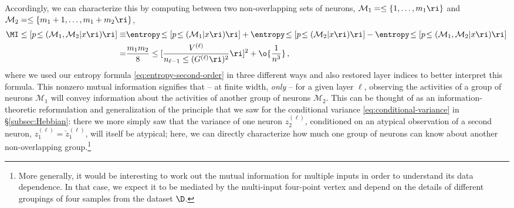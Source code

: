 Accordingly, we can characterize this  by computing  between two non-overlapping sets of neurons, $\mathcal{M}_1=\le\{1,\ldots,m_1\ri\}$ and $\mathcal{M}_2=\le\{m_1+1,\ldots,m_1+m_2\ri\}$, %
\begin{align}\label{eq:MIT-second-order}
\MI\le[p\!\le( \mathcal{M}_1 , \mathcal{M}_2 \vert x\ri)\ri]\equiv&\entropy\!\le[p\!\le(\mathcal{M}_1 \vert x\ri)\ri]+\entropy\!\le[p\!\le(\mathcal{M}_2 \vert x\ri)\ri]-\entropy\!\le[p\!\le(\mathcal{M}_1 , \mathcal{M}_2 \vert x\ri)\ri]\, \\
=&\frac{m_1m_2}{8}\le[\frac{V^{(\ell)}}{n_{\ell-1} \le(G^{(\ell)}\ri)^2 }\ri]^2+\o{\frac{1}{n^3}}\, ,\notag
\end{align}
where we used our entropy formula \eqref{eq:entropy-second-order} in three different ways and also restored layer indices 
to better interpret this formula.
This nonzero mutual information signifies that -- at finite width, \emph{only} --  for a given layer $\ell$, observing the activities of a group of neurons $\mathcal{M}_1$ will convey information about the activities of another group of neurons $\mathcal{M}_2$. This can be thought of as an information-theoretic reformulation and generalization of the  principle that we saw for the conditional variance \eqref{eq:conditional-variance} in \S\ref{subsec:Hebbian}: there we more simply saw that the variance of one neuron $z_2^{(\ell)}$, conditioned on an atypical observation of a second neuron, $z_1^{(\ell)} = \check{z}_1^{(\ell)}$, will itself be atypical; here, we can directly characterize how much one group of neurons can know about another non-overlapping group.\footnote{
    More generally, it would be interesting to work out the mutual information for multiple inputs in order to understand its data dependence. In that case, we expect it to be mediated by the multi-input four-point vertex and depend on the details of different groupings of four samples from the dataset $\D$.
}

 


